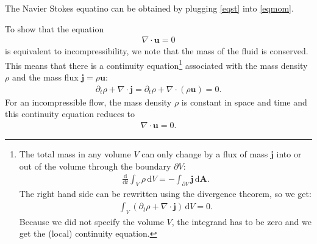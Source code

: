 \documentclass[a4paper,10pt,bibtotoc]{scrartcl}
\begin{document}
The Navier Stokes equatino can be obtained by plugging \autoref{eqst} into \autoref{eqmom}. 


To show that the equation
\begin{align}
 \nabla\cdot \mathbf{u} = 0
\end{align}
is equivalent to incompressibility, we note that the mass of the fluid is conserved. This means that there is a continuity equation\footnote{The total mass in any volume $V$ can only change by a flux of mass $\mathbf{j}$ into or out of the volume through the boundary $\partial V$:  
\begin{align*}
\frac{\mathrm{d}}{\mathrm{d}t}\int_{V}\rho\,\mathrm{d}V = -\int_{\partial V} \mathbf{j}\,\mathrm{d}\mathbf{A}.
\end{align*}
The right hand side can be rewritten using the divergence theorem, so we get:
\begin{align*}
\int_{V}\left(\partial_t\rho+\nabla\cdot\mathbf{j}\right)\,\mathrm{d}V = 0.
\end{align*}
Because we did not specify the volume $V$, the integrand has to be zero and we get the (local) continuity equation.
} associated with the mass density $\rho$ and the mass flux $\mathbf{j} = \rho\mathbf{u}$:
\begin{align}
 \partial_t\rho + \nabla\cdot \mathbf{j} = \partial_t \rho + \nabla\cdot\left(\rho\mathbf{u}\right)= 0.
\end{align}
For an incompressible flow, the mass density $\rho$ is constant in space and time and this continuity equation reduces to
\begin{align}
 \nabla\cdot\mathbf{u} = 0.
\end{align}
\end{document}
